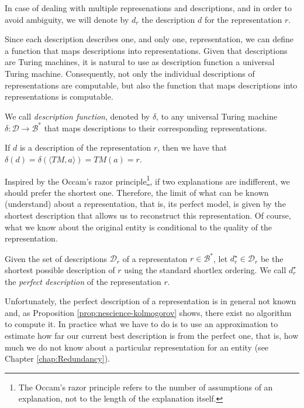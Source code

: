 \begin{notation}
In case of dealing with multiple represenations and descriptions, and in order to avoid ambiguity, we will denote by $d_r$ the description $d$ for the representation $r$.
\end{notation}

Since each description describes one, and only one, representation, we can define a function that maps descriptions into representations. Given that descriptions are Turing machines, it is natural to use as description function a universal Turing machine. Consequently, not only the individual descriptions of representations are computable, but also the function that maps descriptions into representations is computable.

\begin{definition}
We call \emph{description function}, denoted by $\delta$, to any universal Turing machine $\delta : \mathcal{D} \rightarrow \mathcal{B}^\ast$ that maps descriptions to their corresponding representations.
\end{definition}

If $d$ is a description of the representation $r$, then we have that $\delta \left( d \right) = \delta \left( \langle TM, a \rangle \right) = TM(a) = r$.

Inspired by the Occam's razor principle\footnote{The Occam's razor principle refers to the number of assumptions of an explanation, not to the length of the explanation itself.}, if two explanations are indifferent, we should prefer the shortest one. Therefore, the limit of what can be known (understand) about a representation, that is, its perfect model, is given by the shortest description that allows us to reconstruct this representation. Of course, what we know about the original entity is conditional to the quality of the representation.

\begin{definition}
\label{def:descriptions_perfect_model}
Given the set of descriptions $\mathcal{D}_r$ of a representaton $r \in \mathcal{B}^\ast$, let $d_r^{\star} \in \mathcal{D}_r$ be the shortest possible description of $r$ using the standard shortlex ordering. We call $d_r^{\star}$ the \emph{perfect description} of the representation $r$.
\end{definition}

Unfortunately, the perfect description of a representation is in general not known and, as Proposition \ref{prop:nescience-kolmogorov} shows, there exist no algorithm to compute it. In practice what we have to do is to use an approximation to estimate how far our current best description is from the perfect one, that is, how much we do not know about a particular representation for an entity (see Chapter \ref{chap:Redundancy}).

